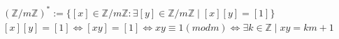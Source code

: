 \begin{solution}

\begin{align}
(\mathbb{Z}/m\mathbb{Z})^* 
:= \{[x] \in \mathbb{Z}/m\mathbb{Z}: 
\exists [y] \in \mathbb{Z}/m\mathbb{Z} \mid [x][y]=[1]\}\\
[x][y]=[1] \iff [xy]=[1] \iff xy \equiv 1 (mod m) 
\iff \exists k \in \mathbb{Z} \mid xy = km + 1\\
\end{align}

\end{solution}